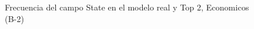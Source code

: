 \begin{figure}[H]
    \centering
    
    \caption{Frecuencia del campo State en el modelo real y Top 2, Economicos (B-2)}
    \label{frecuency-State-top2}
\end{figure}